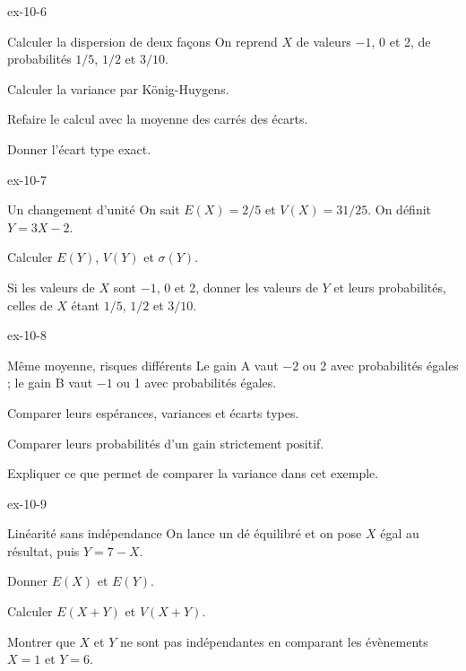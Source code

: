 \clearpage
{}
\begin{blocLivre}{ex-10-6}
\begin{exercice}[2]{Calculer la dispersion de deux façons}
On reprend $X$ de valeurs $-1$, 0 et 2, de probabilités $1/5$, $1/2$ et $3/10$.\begin{questions}
\item Calculer la variance par König-Huygens.
\item Refaire le calcul avec la moyenne des carrés des écarts.
\item Donner l’écart type exact.
\end{questions}
\end{exercice}
\end{blocLivre}
\begin{blocLivre}{ex-10-7}
\begin{exercice}[2]{Un changement d'unité}
On sait $E(X)=2/5$ et $V(X)=31/25$. On définit $Y=3X-2$.\begin{questions}
\item Calculer $E(Y)$, $V(Y)$ et $\sigma(Y)$.
\item Si les valeurs de $X$ sont $-1$, 0 et 2, donner les valeurs de $Y$ et leurs probabilités, celles de $X$ étant $1/5$, $1/2$ et $3/10$.
\end{questions}
\end{exercice}
\end{blocLivre}
\begin{blocLivre}{ex-10-8}
\begin{exercice}[2]{Même moyenne, risques différents}
Le gain A vaut $-2$ ou 2 avec probabilités égales ; le gain B vaut $-1$ ou 1 avec probabilités égales.\begin{questions}
\item Comparer leurs espérances, variances et écarts types.
\item Comparer leurs probabilités d’un gain strictement positif.
\item Expliquer ce que permet de comparer la variance dans cet exemple.
\end{questions}
\end{exercice}
\end{blocLivre}
\begin{blocLivre}{ex-10-9}
\begin{exercice}[2]{Linéarité sans indépendance}
On lance un dé équilibré et on pose $X$ égal au résultat, puis $Y=7-X$.\begin{questions}
\item Donner $E(X)$ et $E(Y)$.
\item Calculer $E(X+Y)$ et $V(X+Y)$.
\item Montrer que $X$ et $Y$ ne sont pas indépendantes en comparant les évènements $X=1$ et $Y=6$.
\end{questions}
\end{exercice}
\end{blocLivre}
